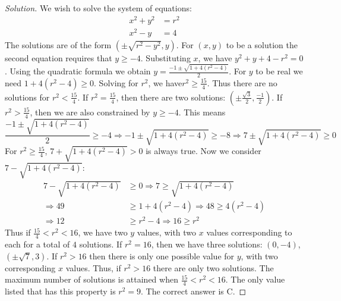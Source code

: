 \documentclass[crop=false,class=book,oneside]{standalone}
\begin{document}
        \begin{proof}[Solution]
            We wish to solve the system of equations:
            \begin{align*}
                x^{2}+y^{2}&=r^{2}\\
                x^{2}-y&=4
            \end{align*}
            The solutions are of the form $(\pm \sqrt{r^2-y^2},y)$.
            For $(x,y)$ to be a solution
            the second equation requires
            that $y\geq -4$. Substituting $x$, we have
            $y^{2}+y+4-r^{2}=0$. Using the quadratic formula
            we obtain
            $y=\frac{-1\pm\sqrt{1+4(r^{2}-4)}}{2}$.
            For $y$ to be real
            we need $1+4(r^{2}-4)\geq 0$. Solving for $r^2$,
            we have$r^{2}\geq\frac{15}{4}$.
            Thus there are no solutions for
            $r^{2}<\frac{15}{4}$. If $r^{2}=\frac{15}{4}$,
            then there are two solutions:
            $(\pm\frac{\sqrt{3}}{2},\frac{-1}{2})$. If
            $r^{2}>\frac{15}{4}$, then we are
            also constrained by $y\geq-4$. This means 
            \begin{equation*}
                \frac{-1\pm\sqrt{1+4(r^{2}-4)}}{2}\geq-4
                \Rightarrow -1\pm\sqrt{1+4(r^{2}-4)}\geq-8
                \Rightarrow 7\pm\sqrt{1+4(r^{2}-4)}\geq 0
            \end{equation*}
            For $r^2 \geq \frac{15}{4}$, $7+\sqrt{1+4(r^2-4)}>0$
            is always true. Now we consider $7-\sqrt{1+4(r^2-4)}:$
            \begin{align*}
                7-\sqrt{1+4(r^{2}-4)}&\geq 0
                \Rightarrow 7\geq\sqrt{1+4(r^{2}-4)}\\
                \Rightarrow 49&\geq 1+4(r^{2}-4)\Rightarrow
                48\geq 4(r^{2}-4)\\
                \Rightarrow 12&\geq r^{2}-4\Rightarrow 16\geq r^{2}
            \end{align*}
            Thus if $\frac{15}{4}<r^2<16$, we have two $y$ values, with two $x$ values corresponding to each for a total of $4$ solutions. If $r^2 = 16$, then we have three solutions: $(0,-4)$, $(\pm \sqrt{7},3)$. If $r^2>16$ then there is only one possible value for $y$, with two corresponding $x$ values. Thus, if $r^2>16$ there are only two solutions. The maximum number of solutions is attained when $\frac{15}{4} < r^2 <16$. The only value listed that has this property is $r^2 = 9$. The correct answer is C.
            \end{proof}
\end{document}
